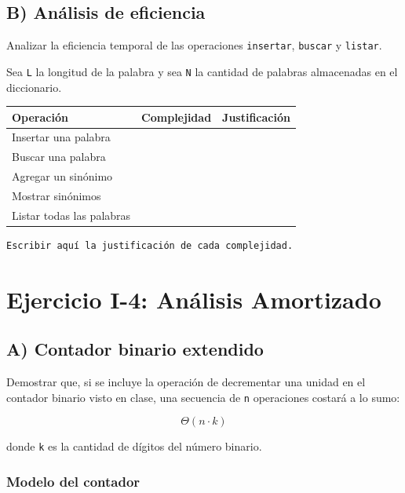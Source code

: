 \documentclass[11pt]{article}
\begin{document}
\subsection{B) Análisis de eficiencia}
\label{sec:org8e856ed}

Analizar la eficiencia temporal de las operaciones \texttt{insertar}, \texttt{buscar} y \texttt{listar}.

Sea \texttt{L} la longitud de la palabra y sea \texttt{N} la cantidad de palabras almacenadas en el diccionario.

\begin{center}
\begin{tabular}{lll}
Operación & Complejidad & Justificación\\[0pt]
\hline
Insertar una palabra &  & \\[0pt]
Buscar una palabra &  & \\[0pt]
Agregar un sinónimo &  & \\[0pt]
Mostrar sinónimos &  & \\[0pt]
Listar todas las palabras &  & \\[0pt]
\end{tabular}
\end{center}

\begin{verbatim}
Escribir aquí la justificación de cada complejidad.
\end{verbatim}

\section{Ejercicio I-4: Análisis Amortizado}
\label{sec:org468fb29}

\subsection{A) Contador binario extendido}
\label{sec:orgd60f424}

Demostrar que, si se incluye la operación de decrementar una unidad en el contador binario visto en clase, una secuencia de \texttt{n} operaciones costará a lo sumo:

\[
\Theta(n \cdot k)
\]

donde \texttt{k} es la cantidad de dígitos del número binario.

\subsubsection{Modelo del contador}
\label{sec:org581b7f7}
\end{document}
